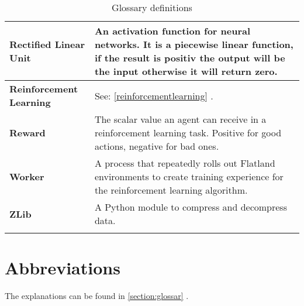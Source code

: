 \begin{longtable}{|m{3cm}|m{11cm}|}
\textbf{Rectified Linear Unit}& \label{rectifiedlinearunit}
An activation function for neural networks. It is a piecewise linear function, if the result is positiv the output will be the input otherwise it will return zero.\\
\hline

\textbf{Reinforcement Learning}&
See: \ref{reinforcementlearning} \nameref{reinforcementlearning}.\\
\hline

\textbf{Reward}&
The scalar value an agent can receive in a reinforcement learning task. Positive for good actions, negative for bad ones.\\ 
\hline

\textbf{Worker}&
A process that repeatedly rolls out Flatland environments to create training experience for the reinforcement learning algorithm.\\
\hline

\textbf{ZLib}&
A Python module to compress and decompress data. \\ \hline





\caption{Glossary definitions}
\label{tab:glossar}
\end{longtable}
\clearpage

\section{Abbreviations}\label{section:abkuerzungsverzeichnis}

The explanations can be found in \ref{section:glossar} .

